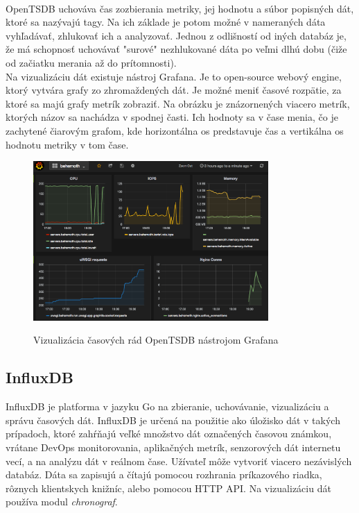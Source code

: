\documentclass[printed,11pt,twoside,color,cover,table]{fithesis3}
\begin{document}
\\OpenTSDB uchováva čas zozbierania metriky, jej hodnotu a súbor popisných dát, ktoré sa nazývajú tagy. Na ich základe je potom možné
v nameraných dáta vyhľadávať, zhlukovať ich a analyzovať. Jednou z odlišností od iných databáz je, že má schopnosť uchovávať "surové" nezhlukované dáta po veľmi dlhú dobu (čiže od začiatku merania až do prítomnosti).
\\Na vizualizáciu dát existuje nástroj Grafana. Je to open-source webový engine, ktorý vytvára grafy zo zhromaždených dát. Je možné meniť časové rozpätie, za ktoré sa majú grafy metrík zobraziť.
Na obrázku je znázornených viacero metrík, ktorých názov sa nachádza v spodnej časti. Ich hodnoty sa v čase menia, čo je zachytené čiarovým grafom, kde horizontálna os predstavuje čas a vertikálna os hodnotu
metriky v tom čase.
\begin{figure}[h]
\begin{center}
       \includegraphics[width=0.8\textwidth]{images/grafana.png}
       \caption{Vizualizácia časových rád OpenTSDB nástrojom Grafana}\cite{grafana}
\end{center}
\end{figure}

\subsection{InfluxDB}
InfluxDB je platforma v jazyku Go na zbieranie, uchovávanie, vizualizáciu a správu časových dát. InfluxDB je určená na použitie ako úložisko dát v takých prípadoch, ktoré zahŕňajú veľké množstvo
dát označených časovou známkou, vrátane DevOps monitorovania, aplikačných metrík, senzorových dát internetu vecí, a na analýzu dát v reálnom čase.\cite{influxdb}
 Užívateľ môže vytvoriť viacero nezávislých databáz. 
Dáta sa zapisujú a čítajú pomocou rozhrania príkazového riadka, rôznych klientskych knižníc, alebo pomocou HTTP API. Na vizualizáciu dát používa modul \emph{chronograf}.
\end{document}
